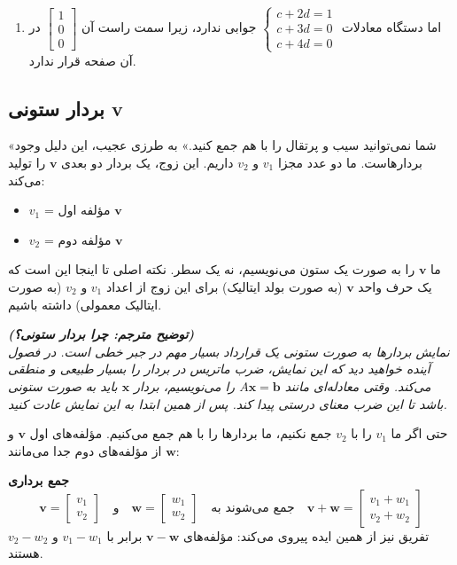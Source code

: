 \documentclass[12pt, a4paper]{book}
\begin{document}
\begin{enumerate}
		\item اما دستگاه معادلات $ \begin{cases} c+2d=1 \\ c+3d=0 \\ c+4d=0 \end{cases} $ جوابی ندارد، زیرا سمت راست آن $\begin{bmatrix} 1 \\ 0 \\ 0 \end{bmatrix}$ در آن صفحه قرار ندارد.
	\end{enumerate}
	
	\subsection*{بردار ستونی v}
	«شما نمی‌توانید سیب و پرتقال را با هم جمع کنید.» به طرزی عجیب، این دلیل وجود بردارهاست. ما دو عدد مجزا $v_1$ و $v_2$ داریم. این زوج، یک بردار دو بعدی $\mathbf{v}$ را تولید می‌کند:
	\begin{itemize}
		\item $v_1$ = مؤلفه اول $\mathbf{v}$
		\item $v_2$ = مؤلفه دوم $\mathbf{v}$
	\end{itemize}
	ما $\mathbf{v}$ را به صورت یک ستون می‌نویسیم، نه یک سطر. نکته اصلی تا اینجا این است که یک حرف واحد $\mathbf{v}$ (به صورت بولد ایتالیک) برای این زوج از اعداد $v_1$ و $v_2$ (به صورت ایتالیک معمولی) داشته باشیم.
	
	\vspace{5mm}
	\textit{\textbf{(توضیح مترجم: چرا بردار ستونی؟)} \\
		نمایش بردارها به صورت ستونی یک قرارداد بسیار مهم در جبر خطی است. در فصول آینده خواهید دید که این نمایش، ضرب ماتریس در بردار را بسیار طبیعی و منطقی می‌کند. وقتی معادله‌ای مانند $A\mathbf{x} = \mathbf{b}$ را می‌نویسیم، بردار $\mathbf{x}$ باید به صورت ستونی باشد تا این ضرب معنای درستی پیدا کند. پس از همین ابتدا به این نمایش عادت کنید.}
	\vspace{5mm}
	
	حتی اگر ما $v_1$ را با $v_2$ جمع نکنیم، ما بردارها را با هم جمع می‌کنیم. مؤلفه‌های اول $\mathbf{v}$ و $\mathbf{w}$ از مؤلفه‌های دوم جدا می‌مانند:
	
	\textbf{جمع برداری}
	\[ \mathbf{v} = \begin{bmatrix} v_1 \\ v_2 \end{bmatrix} \quad \text{و} \quad \mathbf{w} = \begin{bmatrix} w_1 \\ w_2 \end{bmatrix} \quad \text{جمع می‌شوند به} \quad \mathbf{v} + \mathbf{w} = \begin{bmatrix} v_1 + w_1 \\ v_2 + w_2 \end{bmatrix} \]
	تفریق نیز از همین ایده پیروی می‌کند: مؤلفه‌های $\mathbf{v} - \mathbf{w}$ برابر با $v_1 - w_1$ و $v_2 - w_2$ هستند.
	
\end{document}
